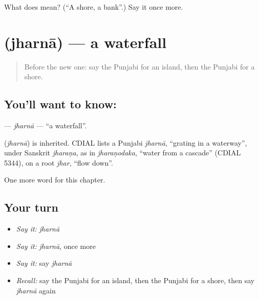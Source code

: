 \begin{tcolorbox}[breakable,colback=teal!4,colframe=teal!35!black,title={Before you move on}]
What does  mean? (\textquotedblleft{}A shore, a bank\textquotedblright{}.) Say it once more.
\end{tcolorbox}
\section[\texorpdfstring{\pa{ਝਰਨਾ} (jharnā)}{ਝਰਨਾ (jharnā)}]{ (jharnā) — a waterfall}

\label{lesson:PA-C127-jharna}



\begin{quote}
Before the new one: say the Punjabi for an island, then the Punjabi for a shore.
\end{quote}

\subsection*{You'll want to know: }
\textbf{} — \emph{jharnā} — \textquotedblleft{}a waterfall\textquotedblright{}.

\begin{cousinweb}
\textbf{} (\emph{jharnā}) is inherited. CDIAL lists a Punjabi \emph{jharnā}, \textquotedblleft{}grating in a waterway\textquotedblright{}, under Sanskrit \emph{jharaṇa}, as in \emph{jharaṇodaka}, \textquotedblleft{}water from a cascade\textquotedblright{} (CDIAL 5344), on a root \emph{jhar}, \textquotedblleft{}flow down\textquotedblright{}.
\end{cousinweb}

\begin{grammarlens}[title={What you've built}]
One more word for this chapter.
\end{grammarlens}

\subsection*{Your turn}
\begin{itemize}
\raggedright
  \item \emph{Say it:} \emph{jharnā}
  \item \emph{Say it:} \emph{jharnā}, once more
  \item \emph{Say it:} say \emph{jharnā}
  \item \emph{Recall:} say the Punjabi for an island, then the Punjabi for a shore, then say \emph{jharnā} again
\end{itemize}

